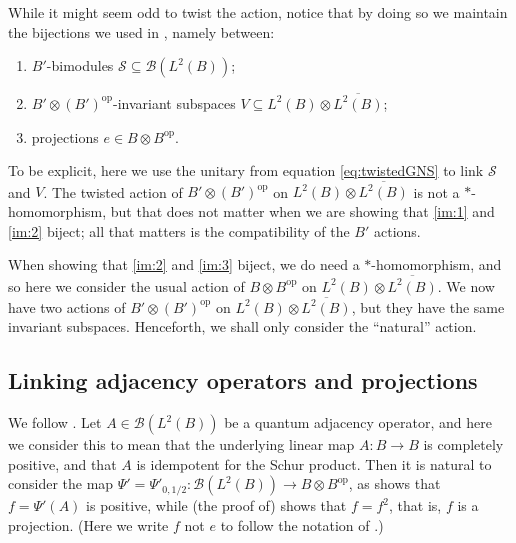 \documentclass[a4paper,11pt]{article}
\theoremstyle{plain}
\theoremstyle{remark}
\newcommand{\mc}[1]{\mathcal{#1}}
\newcommand{\op}{{\operatorname{op}}}
\begin{document}
While it might seem odd to twist the action, notice that by doing so we maintain the bijections we used in \cite{daws_quantum_graphs}, namely between:
\begin{enumerate}[(1)]
  \item\label{im:1} $B'$-bimodules $\mc S \subseteq \mc B(L^2(B))$;
  \item\label{im:2} $B'\otimes (B')^\op$-invariant subspaces $V \subseteq L^2(B) \otimes \overline{L^2(B)}$;
  \item\label{im:3} projections $e\in B\otimes B^\op$.
\end{enumerate}

To be explicit, here we use the unitary from equation \eqref{eq:twistedGNS} to link $\mc S$ and $V$.  The twisted action of $B'\otimes (B')^\op$ on $L^2(B) \otimes \overline{L^2(B)}$ is not a $*$-homomorphism, but that does not matter when we are showing that \ref{im:1} and \ref{im:2} biject; all that matters is the compatibility of the $B'$ actions.

When showing that \ref{im:2} and \ref{im:3} biject, we do need a $*$-homomorphism, and so here we consider the usual action of $B\otimes B^\op$ on $L^2(B) \otimes \overline{L^2(B)}$.  We now have two actions of $B'\otimes (B')^\op$ on $L^2(B) \otimes \overline{L^2(B)}$, but they have the same invariant subspaces.  Henceforth, we shall only consider the ``natural'' action.


\subsection{Linking adjacency operators and projections}\label{sec:adj_proj}

We follow \cite[Section~5.4]{daws_quantum_graphs}.  Let $A\in\mc B(L^2(B))$ be a quantum adjacency operator, and here we consider this to mean that the underlying linear map $A\colon B\to B$ is completely positive, and that $A$ is idempotent for the Schur product.  Then it is natural to consider the map $\Psi' = \Psi'_{0,1/2} \colon \mc B(L^2(B)) \to B \otimes B^\op$, as \cite[Theorem~5.36]{daws_quantum_graphs} shows that $f = \Psi'(A)$ is positive, while (the proof of) \cite[Theorem~5.37]{daws_quantum_graphs} shows that $f=f^2$, that is, $f$ is a projection.  (Here we write $f$ not $e$ to follow the notation of \cite[Theorem~5.37]{daws_quantum_graphs}.)
\end{document}
